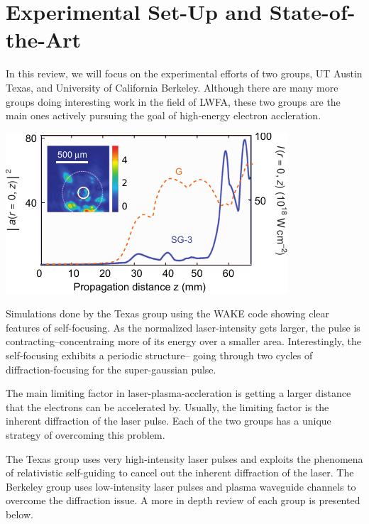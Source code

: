 \documentclass[12pt, titlepage]{article}
\begin{document}
\section{Experimental Set-Up and State-of-the-Art}
In this review, we will focus on the experimental efforts of two groups, UT
Austin Texas, and University of California Berkeley. Although there are many
more groups doing interesting work in the field of LWFA, these two groups are
the main ones actively pursuing the goal of high-energy electron
accleration.
\begin{marginfigure}
	\includegraphics[width=\marginparwidth]{../figures/wakesimulation.pdf}
    \caption{Simulations done by the Texas group using the WAKE
        code showing clear features of self-focusing.\cite{Wang2013} As the
        normalized laser-intensity gets larger, the pulse is
        contracting--concentraing more of its energy over a smaller area.
        Interestingly, the self-focusing exhibits a periodic structure-- going
        through two cycles of diffraction-focusing for the super-gaussian
    pulse.\label{fig:propsim}}
\end{marginfigure}



The main limiting factor in laser-plasma-accleration is getting a larger
distance that the electrons can be accelerated by. Usually, the limiting factor
is the inherent diffraction of the laser pulse. Each of the two groups has a
unique strategy of overcoming this problem. 

The Texas group uses very high-intensity laser pulses and exploits the
phenomena of relativistic self-guiding to cancel out the inherent diffraction
of the laser. The Berkeley group uses low-intensity laser pulses and plasma waveguide channels to overcome the diffraction issue. A more in depth review of
each group is presented below.
\end{document}

